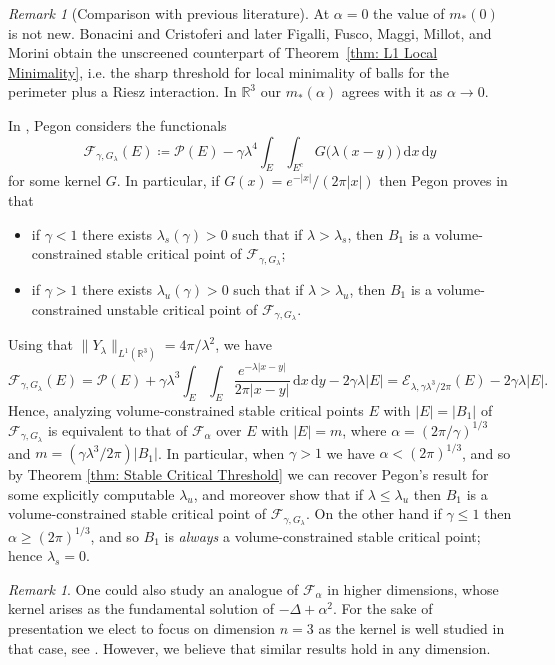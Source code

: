\documentclass[a4paper,11pt,reqno]{amsart}
\numberwithin{equation}{section}
\theoremstyle{remark}
\newtheorem{remark}[theorem]{Remark}
\theoremstyle{definition}
\newcommand{\R}{\mathbb R}
\newcommand{\dd}{\,\mathrm{d}}
\newcommand{\defeq}{\coloneqq}
\newcommand{\enf}{\mathcal{F}_{\alpha}}
\renewcommand{\leq}{\leqslant}
\renewcommand{\geq}{\geqslant}
\newcommand{\calF}{\mathcal{F}}
\newcommand{\calE}{\mathcal{E}}
\newcommand{\Pe}{\mathcal{P}}
\begin{document}
\begin{remark}[Comparison with previous literature]\label{rem:comparison}
At $\alpha=0$ the value of $m_*(0)$ is not new. Bonacini and Cristoferi \cite{BC} and later Figalli, Fusco, Maggi, Millot, and Morini \cite{FFMMM} obtain the unscreened counterpart of Theorem~\ref{thm: L1 Local Minimality}, i.e. the sharp threshold for local minimality of balls for the perimeter plus a Riesz interaction. In $\R^3$ our $m_*(\alpha)$ agrees with it as $\alpha\to0$.

In \cite{Peg}, Pegon considers the functionals
	\[
		\mathcal{F}_{\gamma, G_{\lambda}}(E) \defeq  \Pe(E)-\gamma\lambda^4 \int_E\int_{E^c} G\big(\lambda (x-y)\big) \dd x \dd y
	\]
for some kernel $G$. In particular, if $G(x) = e^{-|x|}/(2\pi |x|)$ then Pegon proves in \cite[Theorem C]{Peg} that
	\begin{itemize}
		\item if $\gamma<1$ there exists $\lambda_s(\gamma)>0$ such that if $\lambda>\lambda_s$, then $B_1$ is a volume-constrained stable critical point of $\mathcal{F}_{\gamma,G_{\lambda}}$;
		\item if $\gamma >1$  there exists $\lambda_u(\gamma)>0$ such that if $\lambda>\lambda_u$, then $B_1$ is a volume-constrained unstable critical point of $\mathcal{F}_{\gamma,G_{\lambda}}$.
	\end{itemize}	
Using that $\|Y_{\lambda}\|_{L^1(\mathbb{R}^3)} = 4\pi/\lambda^2$, we have
	\[
		\mathcal{F}_{\gamma, G_{\lambda}}(E) = \Pe(E) + \gamma\lambda^3 \int_E\int_E \frac{e^{-\lambda|x-y|}}{2\pi|x-y|}  \dd x \dd y - 2\gamma \lambda |E| = \calE_{\lambda, \gamma \lambda^3/2\pi}(E)-2\gamma\lambda|E|.
		\]
Hence, analyzing volume-constrained stable critical points $E$ with $|E|=|B_1|$ of $\mathcal{F}_{\gamma, G_{\lambda}}$ is equivalent to that of $\calF_{\alpha}$ over $E$ with $|E|=m$, where $\alpha=(2\pi/\gamma)^{1/3}$ and $m=(\gamma\lambda^3/2\pi)|B_1|$. In particular, when $\gamma>1$ we have $\alpha<(2\pi)^{1/3}$, and so by Theorem \ref{thm: Stable Critical Threshold} we can recover Pegon's result for some explicitly computable $\lambda_u$, and moreover show that if $\lambda \leq \lambda_u$ then $B_1$ is a volume-constrained stable critical point of $\calF_{\gamma, G_{\lambda}}$. On the other hand if $\gamma \leq 1$ then $\alpha \geq (2\pi)^{1/3}$, and so $B_1$ is \textit{always} a volume-constrained stable critical point; hence $\lambda_s=0$.
\end{remark}

\begin{remark} One could also study an analogue of $\enf$ in higher dimensions, whose kernel arises as the fundamental solution of $-\Delta+\alpha^2$. For the sake of presentation we elect to focus on dimension $n=3$ as the kernel is well studied in that case, see \cite{Winkelmann}. However, we believe that similar results hold in any dimension.
\end{remark}
\end{document}

